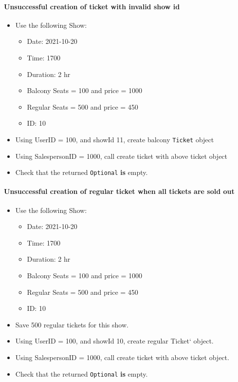 \documentclass[]{article}
\providecommand{\tightlist}{%
  \setlength{\itemsep}{0pt}\setlength{\parskip}{0pt}}
\let\oldparagraph\paragraph
\renewcommand{\paragraph}[1]{\oldparagraph{#1}\mbox{}}
\begin{document}
\hypertarget{unsuccessful-creation-of-ticket-with-invalid-show-id}{%
\paragraph{Unsuccessful creation of ticket with invalid show
id}\label{unsuccessful-creation-of-ticket-with-invalid-show-id}}

\begin{itemize}
\tightlist
\item
  Use the following Show:

  \begin{itemize}
  \tightlist
  \item
    Date: 2021-10-20
  \item
    Time: 1700
  \item
    Duration: 2 hr
  \item
    Balcony Seats = 100 and price = 1000
  \item
    Regular Seats = 500 and price = 450
  \item
    ID: 10
  \end{itemize}
\item
  Using UserID = 100, and showId 11, create balcony \texttt{Ticket}
  object
\item
  Using SalespersonID = 1000, call create ticket with above ticket
  object
\item
  Check that the returned \texttt{Optional} \textbf{is} empty.
\end{itemize}

\hypertarget{unsuccessful-creation-of-regular-ticket-when-all-tickets-are-sold-out}{%
\paragraph{Unsuccessful creation of regular ticket when all tickets are
sold
out}\label{unsuccessful-creation-of-regular-ticket-when-all-tickets-are-sold-out}}

\begin{itemize}
\tightlist
\item
  Use the following Show:

  \begin{itemize}
  \tightlist
  \item
    Date: 2021-10-20
  \item
    Time: 1700
  \item
    Duration: 2 hr
  \item
    Balcony Seats = 100 and price = 1000
  \item
    Regular Seats = 500 and price = 450
  \item
    ID: 10
  \end{itemize}
\item
  Save 500 regular tickets for this show.
\item
  Using UserID = 100, and showId 10, create regular Ticket` object.
\item
  Using SalespersonID = 1000, call create ticket with above ticket
  object.
\item
  Check that the returned \texttt{Optional} \textbf{is} empty.
\end{itemize}
\end{document}
